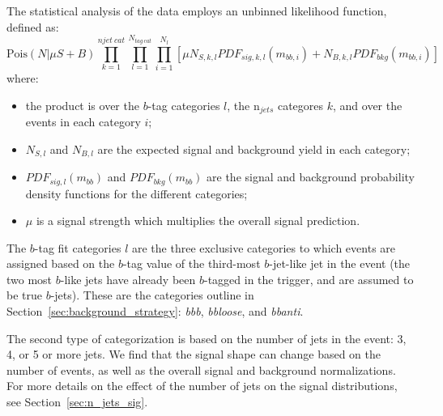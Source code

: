 The statistical analysis of the data employs an unbinned likelihood
function, defined as:
\begin{equation}
\text{Pois}(N|\mu S+B) \prod_{k=1}^{njet\ cat} \prod_{l=1}^{N_{tag\ cat}} \prod_{i=1}^{N_{l}} \left[ \mu N_{S,k,l} PDF_{sig,k,l}(m_{bb,i}) + N_{B,k,l} PDF_{bkg}(m_{bb,i}) \right]
\end{equation}
where:
\begin{itemize}
\item the product is over the $b$-tag categories $l$, the n$_{jets}$ categores $k$, and over the events in each category $i$;
\item $N_{S,l}$ and $N_{B,l}$ are the expected signal and background yield in each category;
\item $PDF_{sig,l}(m_{bb})$ and $PDF_{bkg}(m_{bb})$ are the signal and background probability density functions for  the different categories;
\item $\mu$ is a signal strength which multiplies the overall signal prediction.
\end{itemize}


The $b$-tag fit categories $l$ are the three exclusive categories to which events are assigned
based on the $b$-tag value of the third-most $b$-jet-like jet in the event (the two most
$b$-like jets have already been $b$-tagged in the trigger, and are assumed to be true
$b$-jets).  These are the categories outline in Section~\ref{sec:background_strategy}: 
\textit{bbb}, \textit{bbloose}, and \textit{bbanti}. 




The second type of categorization is based on the number of 
jets in the event: 3, 4, or 5 or more jets.  We find that the signal
shape can change based on the number of events, as well as the overall
signal and background normalizations.  For more details on the effect of 
the number of jets on the signal distributions, see Section~\ref{sec:n_jets_sig}. 


